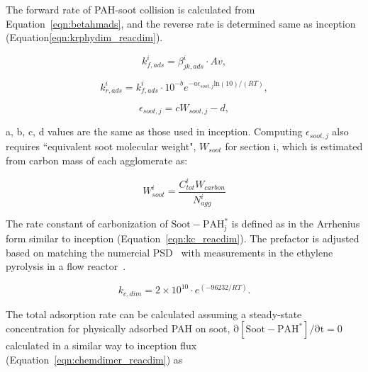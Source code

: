 

The forward rate of PAH-soot collision is calculated from Equation~\eqref{eqn:betahmads}, and the reverse rate is determined same as inception (Equation\eqref{eqn:krphydim_reacdim}).

\begin{equation}
	k^i_{f,ads}=\beta^i_{jk,ads}\cdot Av
	\label{eqn:kfads_reacdim},
\end{equation}

\begin{equation}
	k^i_{r,ads}=k^i_{f,ads}\cdot10^{-b}e^{-a\epsilon_{soot,j} \mathrm{ln}(10)/(RT)}
	\label{eqn:krads_reacdim},
\end{equation}

\begin{equation}
	\epsilon_{soot,j} = cW_{soot,j} -d
	\label{eqn:epsilonads_reacdim},
\end{equation}

a, b, c, d values are the same as those used in inception. Computing ${\epsilon_{soot,j}}$ also requires ``equivalent soot molecular weight", ${W_{soot}}$ for section i, which is estimated from carbon mass of each agglomerate as:

\begin{equation}
	W^i_{soot}=\frac{C^i_{tot}W_{carbon}}{N^i_{agg}} 
\end{equation}

The rate constant of carbonization of $\mathrm{Soot-PAH^*_j}$ is defined as in the Arrhenius form similar to inception (Equation~\eqref{eqn:kc_reacdim}). The prefactor is adjusted based on matching the numercial PSD~\citep{naseri2022simulating} with measurements in the ethylene pyrolysis in a flow reactor~\cite{araki2021effects}. 

\begin{equation}
	k_{c,dim} = 2\times10^{10}\cdot e^{(-96232/RT)}
	\label{eqn:kcads_reacdim}.
\end{equation}


The total adsorption rate can be calculated assuming a steady-state concentration for physically adsorbed PAH on soot, $\mathrm{\partial{[{Soot-PAH^*}]}/\partial t = 0}$ calculated in a similar way to inception flux (Equation~\eqref{eqn:chemdimer_reacdim}) as\\

